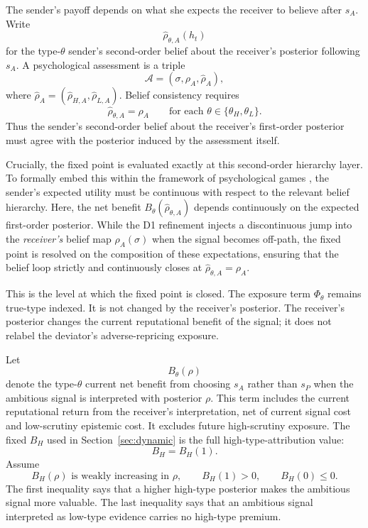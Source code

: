 The sender's payoff depends on what she expects the receiver to believe after \(s_A\). Write
\[
\widehat \rho_{\theta,A}(h_t)
\]
for the type-\(\theta\) sender's second-order belief about the receiver's posterior following \(s_A\). A psychological assessment is a triple
\[
\mathcal A=(\sigma,\rho_A,\widehat \rho_A),
\]
where \(\widehat \rho_A=(\widehat\rho_{H,A},\widehat\rho_{L,A})\). Belief consistency requires
\[
\widehat\rho_{\theta,A}=\rho_A
\qquad\text{for each }\theta\in\{\theta_H,\theta_L\}.
\]
Thus the sender's second-order belief about the receiver's first-order posterior must agree with the posterior induced by the assessment itself.

Crucially, the fixed point is evaluated exactly at this second-order hierarchy layer. To formally embed this within the framework of psychological games \citep{battigalli2009dynamic}, the sender's expected utility must be continuous with respect to the relevant belief hierarchy. Here, the net benefit $B_\theta(\widehat{\rho}_{\theta,A})$ depends continuously on the expected first-order posterior. While the D1 refinement injects a discontinuous jump into the \emph{receiver's} belief map $\rho_A(\sigma)$ when the signal becomes off-path, the fixed point is resolved on the composition of these expectations, ensuring that the belief loop strictly and continuously closes at $\widehat\rho_{\theta,A} = \rho_A$.

This is the level at which the fixed point is closed. The exposure term \(\Phi_\theta\) remains true-type indexed. It is not changed by the receiver's posterior. The receiver's posterior changes the current reputational benefit of the signal; it does not relabel the deviator's adverse-repricing exposure.

Let
\[
B_\theta(\rho)
\]
denote the type-\(\theta\) current net benefit from choosing \(s_A\) rather than \(s_P\) when the ambitious signal is interpreted with posterior \(\rho\). This term includes the current reputational return from the receiver's interpretation, net of current signal cost and low-scrutiny epistemic cost. It excludes future high-scrutiny exposure. The fixed \(B_H\) used in Section~\ref{sec:dynamic} is the full high-type-attribution value:
\[
B_H=B_H(1).
\]
Assume
\[
B_H(\rho)\text{ is weakly increasing in }\rho,
\qquad
B_H(1)>0,
\qquad
B_H(0)\le 0.
\]
The first inequality says that a higher high-type posterior makes the ambitious signal more valuable. The last inequality says that an ambitious signal interpreted as low-type evidence carries no high-type premium.

